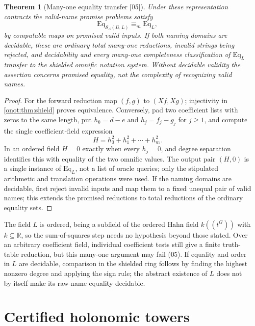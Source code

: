 \documentclass[11pt,oneside]{article}
\numberwithin{equation}{section}
\newtheorem{theorem}{Theorem}[section]
\theoremstyle{definition}
\theoremstyle{remark}
\newcommand{\R}{\mathbb R}
\newcommand{\Eq}{\mathrm{Eq}}
\newcommand{\src}[1]{\textup{\textsf{\small[#1]}}}
\begin{document}
\begin{theorem}[Many-one equality transfer \src{05}]\label{onot:thm:eqtransfer}
Under these representation contracts the valid-name promise problems satisfy
\[
 \Eq_{\mathcal S_\Lambda(D,L)}\equiv_m\Eq_L,
\]
by computable maps on promised valid inputs. If both naming domains are
decidable, these are ordinary total many-one reductions, invalid strings being
rejected, and decidability and every many-one completeness classification of
$\Eq_L$ transfer to the shielded omnific notation system. Without decidable
validity the assertion concerns promised equality, not the complexity of
recognizing valid names.
\end{theorem}
\begin{proof}
For the forward reduction map $(f,g)$ to $(Xf,Xg)$; injectivity in
\cref{onot:thm:shield} proves equivalence. Conversely, pad two coefficient lists
with zeros to the same length, put $h_0=d-e$ and $h_j=f_j-g_j$ for $j\ge1$, and
compute the single coefficient-field expression
\begin{equation}\label{onot:eq:squares}
 H=h_0^2+h_1^2+\cdots+h_m^2.
\end{equation}
In an ordered field $H=0$ exactly when every $h_j=0$, and degree separation
identifies this with equality of the two omnific values. The output pair $(H,0)$
is a single instance of $\Eq_L$, not a list of oracle queries; only the
stipulated arithmetic and translation operations were used. If the naming
domains are decidable, first reject invalid inputs and map them to a fixed
unequal pair of valid names; this extends the promised reductions to total
reductions of the ordinary equality sets.
\end{proof}

The field $L$ is ordered, being a subfield of the ordered Hahn field
$k((t^G))$ with $k\subseteq\R$, so the sum-of-squares step needs no hypothesis
beyond those stated. Over an arbitrary coefficient field, individual coefficient
tests still give a finite truth-table reduction, but this many-one argument may
fail (05). If equality and order in $L$ are decidable, comparison in the shielded
ring follows by finding the highest nonzero degree and applying the sign rule;
the abstract existence of $L$ does not by itself make its raw-name equality
decidable.

\part{Certified holonomic towers}\label{onot:hol:part}
\end{document}
